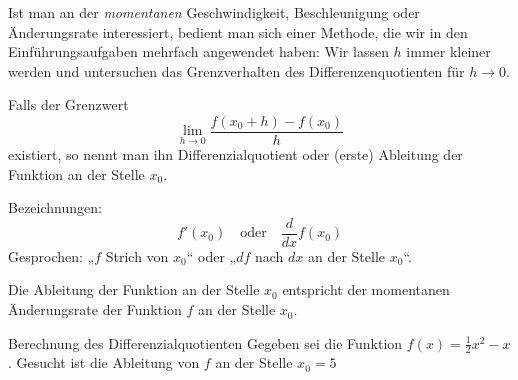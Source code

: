 Ist man an der \emph{momentanen} Geschwindigkeit, Beschleunigung oder Änderungsrate interessiert, bedient man sich einer Methode, die wir in den Einführungsaufgaben mehrfach angewendet haben: Wir lassen $h$ immer kleiner werden und untersuchen das Grenzverhalten des Differenzenquotienten für $h\to 0$.

\begin{deff}[Differenzialquotient]{}
    Falls der Grenzwert
    \[
        \lim\limits_{h\to 0} \frac{f(x_0+h)-f(x_0 )}{h}
    \]
    existiert, so nennt man ihn Differenzialquotient oder (erste) Ableitung der Funktion an der Stelle $x_0$.

    Bezeichnungen:
    \[
        f'(x_0) \quad \text{oder} \quad \frac{d}{dx} f(x_0)
    \]
    Gesprochen: „$f$ Strich von $x_0$“ oder „$df$ nach $dx$ an der Stelle $x_0$“.

    Die Ableitung der Funktion an der Stelle $x_0$ entspricht der momentanen Änderungsrate der Funktion $f$ an der Stelle $x_0$.



\end{deff}


\begin{example}
    {Berechnung des Differenzialquotienten}{}
    Gegeben sei die Funktion $f(x)=\frac{1}{2}x^2-x$. Gesucht ist die Ableitung von $f$ an der Stelle $x_0=5$


\end{example}

